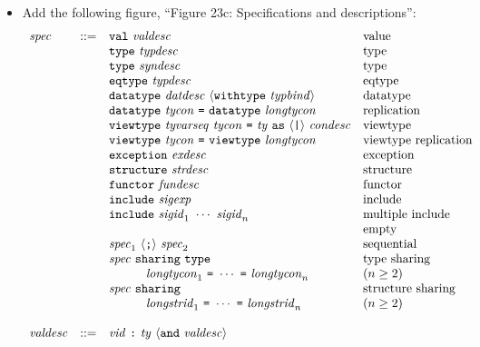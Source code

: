 \documentclass[twoside,titlepage]{article}
\begin{document}
\begin{appendix}
\begin{itemize}
\item Add the following figure, ``Figure 23c: Specifications and descriptions'':
  $$
  \begin{array}{llll}
  \mathit{spec} & ::= & {\tt{val}}~\mathit{valdesc} & \textrm{value} \\
  && {\tt{type}}~\mathit{typdesc} & \textrm{type} \\
  && {\tt{type}}~\mathit{syndesc} & \textrm{type} \\
  && {\tt{eqtype}}~\mathit{typdesc} & \textrm{eqtype} \\
  && {\tt{datatype}}~\mathit{datdesc}~\langle{\tt{withtype}}~\mathit{typbind}\rangle & \textrm{datatype} \\
  && {\tt{datatype}}~\mathit{tycon}~\mbox{\tt=}~{\tt{datatype}}~\mathit{longtycon} & \textrm{replication} \\
  && {\tt{viewtype}}~\mathit{tyvarseq}~\mathit{tycon}~\mbox{\tt=}~\mathit{ty}~{\tt{as}}~\langle\mbox{\tt|}\rangle~\mathit{condesc} & \textrm{viewtype} \\
  && {\tt{viewtype}}~\mathit{tycon}~\mbox{\tt=}~{\tt{viewtype}}~\mathit{longtycon} & \textrm{viewtype replication} \\
  && {\tt{exception}}~\mathit{exdesc} & \textrm{exception} \\
  && {\tt{structure}}~\mathit{strdesc} & \textrm{structure} \\
  && {\tt{functor}}~\mathit{fundesc} & \textrm{functor} \\
  && {\tt{include}}~\mathit{sigexp} & \textrm{include} \\
  && {\tt{include}}~\mathit{sigid}_1~\cdots~\mathit{sigid}_n & \textrm{multiple include} \\
  &&  & \textrm{empty} \\
  && \mathit{spec}_1~\langle\mbox{\tt;}\rangle~\mathit{spec}_2 & \textrm{sequential} \\
  && \mathit{spec}~{\tt{sharing}}~{\tt{type}}~ & \textrm{type sharing} \\
  && ~~~~~~~~~\mathit{longtycon}_1~\mbox{\tt=}~\cdots~\mbox{\tt=}~\mathit{longtycon}_n & (n\geq2) \\
  && \mathit{spec}~{\tt{sharing}}~ & \textrm{structure sharing} \\
  && ~~~~~~~~~\mathit{longstrid}_1~\mbox{\tt=}~\cdots~\mbox{\tt=}~\mathit{longstrid}_n & (n\geq2) \\
  \\
  \mathit{valdesc} & ::= & \mathit{vid}~\mbox{\tt:}~\mathit{ty}~\langle{\tt{and}}~\mathit{valdesc}\rangle \\

\end{array}$$
\end{itemize}
\end{appendix}
\end{document}
